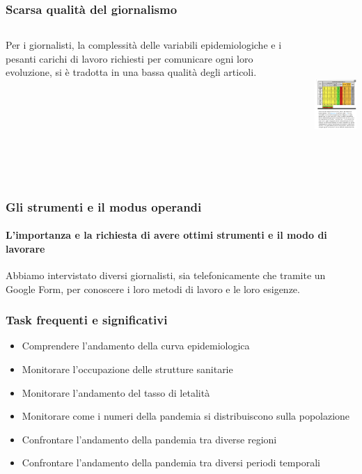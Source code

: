 \documentclass[handout]{beamer}
\begin{document}
		\begin{frame}
			\frametitle{Scarsa qualità del giornalismo}
			\begin{columns}[t]
				\begin{column}[T]{5cm}
					Per i giornalisti, la complessità delle variabili epidemiologiche e i pesanti carichi di lavoro richiesti per comunicare ogni loro evoluzione, si è tradotta in una bassa qualità degli articoli.
				\end{column}

				\begin{column}[T]{5cm}
					\includegraphics[height=5cm]{img/esempio-articolo-brutto}
				\end{column}
			\end{columns}
		\end{frame}







		
		\begin{frame}
			\frametitle{Gli strumenti e il modus operandi}
			\framesubtitle{L'importanza e la richiesta di avere ottimi strumenti e il modo di lavorare}
			Abbiamo intervistato diversi giornalisti, sia telefonicamente che tramite un Google Form, per conoscere i loro metodi di lavoro e le loro esigenze.
		\end{frame}

		\begin{frame}
			\frametitle{Task frequenti e significativi}
			\begin{itemize}[<+->]
				\item Comprendere l'andamento della curva epidemiologica\\
				\item Monitorare l'occupazione delle strutture sanitarie\\
				\item Monitorare l'andamento del tasso di letalità\\
				\item Monitorare come i numeri della pandemia si distribuiscono sulla popolazione\\
				\item Confrontare l'andamento della pandemia tra diverse regioni\\
				\item Confrontare l'andamento della pandemia tra diversi periodi temporali\\
			\end{itemize}
		\end{frame}
\end{document}
